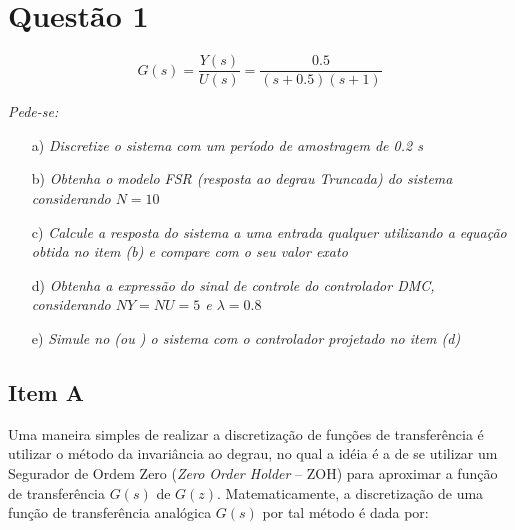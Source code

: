 

\chapter*{Questão 1}

\begin{equation}\nonumber
G(s) = \frac{Y(s)}{U(s)} = \frac{0.5}{(s+0.5)(s+1)}
\end{equation}

{\it Pede-se:}

\begin{itemize}
    \item[a)] {\it Discretize o sistema com um período de amostragem de 0.2 s}
    \item[b)] {\it Obtenha o modelo FSR (resposta ao degrau Truncada) do sistema
              considerando $N = 10$}
    \item[c)] {\it Calcule a resposta do sistema a uma entrada qualquer
              utilizando a equação obtida no item (b) e compare com o seu valor 
              exato}
    \item[d)] {\it Obtenha a expressão do sinal de controle do controlador DMC,
              considerando $NY = NU = 5$ e $\lambda = 0.8$}
    \item[e)] {\it Simule no \Matlab (ou \Scilab) o sistema com o controlador
              projetado no item (d)}
\end{itemize}

\vspace{0.5cm}


\vspace{0.25cm}

\section*{Item A}
Uma maneira simples de realizar a discretização de funções de transferência é
utilizar o método da invariância ao degrau, no qual a idéia é a de se utilizar
um Segurador de Ordem Zero ({\it Zero Order Holder} -- ZOH) para aproximar a
função de transferência $G(s)$ de $G(z)$. Matematicamente, a discretização de
uma função de transferência analógica $G(s)$ por tal método é dada por:

